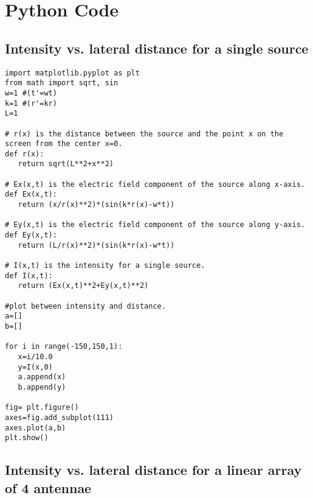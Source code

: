 \chapter{Python Code}

\section{Intensity vs. lateral distance for a single source}\label{code:single}

\begin{Verbatim}[fontsize=\small,baselinestretch=0.9]
import matplotlib.pyplot as plt
from math import sqrt, sin
w=1 #(t'=wt)
k=1 #(r'=kr)
L=1

# r(x) is the distance between the source and the point x on the screen from the center x=0.
def r(x):
   return sqrt(L**2+x**2)

# Ex(x,t) is the electric field component of the source along x-axis.
def Ex(x,t):
   return (x/r(x)**2)*(sin(k*r(x)-w*t))

# Ey(x,t) is the electric field component of the source along y-axis.
def Ey(x,t):
   return (L/r(x)**2)*(sin(k*r(x)-w*t))

# I(x,t) is the intensity for a single source.
def I(x,t):
   return (Ex(x,t)**2+Ey(x,t)**2)

#plot between intensity and distance.
a=[]
b=[]

for i in range(-150,150,1):
   x=i/10.0
   y=I(x,0)
   a.append(x)
   b.append(y)

fig= plt.figure()
axes=fig.add_subplot(111)
axes.plot(a,b)
plt.show()
\end{Verbatim}


\section{Intensity vs. lateral distance for a linear array of 4 antennae}\label{code:four}

